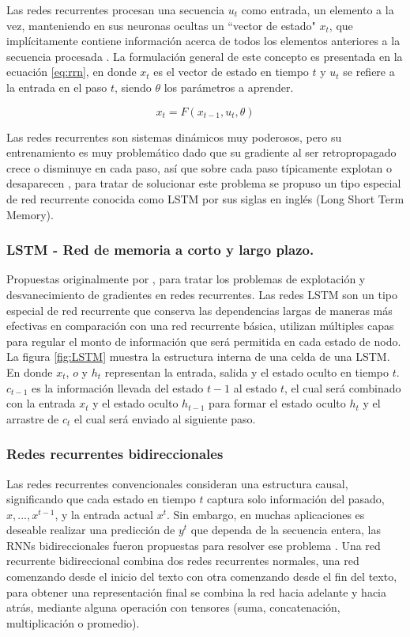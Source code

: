 Las redes recurrentes procesan una secuencia $u_t$ como entrada, un elemento a la vez, manteniendo en sus neuronas ocultas un ``vector de estado" $x_t$, que implícitamente contiene información acerca de todos los elementos anteriores a la secuencia procesada \cite{lecun2015deep}. La formulación general de este concepto es presentada en la ecuación \ref{eq:rrn}, en donde $x_t$ es el vector de estado en tiempo $t$ y $u_t$ se refiere a la entrada en el paso $t$, siendo $\theta$ los parámetros a aprender.


\begin{equation} \label{eq:rrn}
    x_t = F(x_{t-1}, u_t, \theta )
\end{equation}


Las redes recurrentes son sistemas dinámicos muy poderosos, pero su entrenamiento es muy problemático dado que su gradiente al ser retropropagado crece o disminuye en cada paso, así que sobre cada paso típicamente explotan o desaparecen \citep{lecun2015deep}, para tratar de solucionar este problema se propuso un tipo especial de red recurrente conocida como LSTM por sus siglas en inglés (Long Short Term Memory).

\subsubsection{LSTM - Red de memoria a corto y largo plazo.}
Propuestas originalmente por \citep{hochreiter1997long}, para tratar los problemas de explotación y desvanecimiento de gradientes en redes recurrentes. Las redes LSTM son un tipo especial de red recurrente que conserva las dependencias largas de maneras más efectivas en comparación con una red recurrente básica, utilizan múltiples capas para regular el monto de información que será permitida en cada estado de nodo. La figura \ref{fig:LSTM} muestra la estructura interna de una celda de una LSTM. En donde $x_t$, $o$ y $h_t$ representan la entrada, salida y el estado oculto en tiempo $t$. $c_{t-1}$ es la información llevada del estado $t-1$ al estado $t$, el cual será combinado con la entrada $x_t$ y el estado oculto $h_{t-1}$ para formar el estado oculto $h_t$ y el arrastre de $c_t$ el cual será enviado al siguiente paso.




\subsubsection{Redes recurrentes bidireccionales}
Las redes recurrentes convencionales consideran una estructura causal, significando que cada estado en tiempo $t$ captura solo información del pasado, $x,..., x^{t-1}$, y la entrada actual $x^t$. Sin embargo, en muchas aplicaciones es deseable realizar una predicción de $y^t$ que dependa de la secuencia entera, las RNNs bidireccionales fueron propuestas para resolver ese problema \citep{schuster1997bidirectional}. Una red recurrente bidireccional combina dos redes recurrentes normales, una red comenzando desde el inicio del texto con otra comenzando desde el fin del texto, para obtener una representación final se combina la red hacia adelante y hacia atrás, mediante alguna operación con tensores (suma, concatenación, multiplicación o promedio). 

